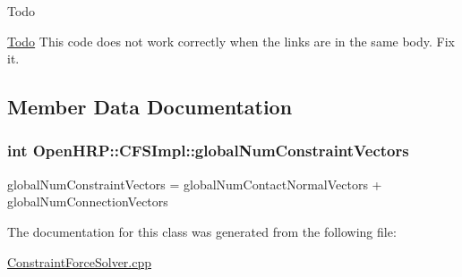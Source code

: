 \begin{DoxyRefDesc}{Todo}
\item[\hyperlink{todo__todo000002}{Todo}]This code does not work correctly when the links are in the same body. Fix it. \end{DoxyRefDesc}


\subsection{Member Data Documentation}
\hypertarget{classOpenHRP_1_1CFSImpl_aa2ce261868d0109321fd9d823aa19680}{
\subsubsection[{global\-Num\-Constraint\-Vectors}]{\setlength{\rightskip}{0pt plus 5cm}int Open\-H\-R\-P\-::\-C\-F\-S\-Impl\-::global\-Num\-Constraint\-Vectors}}\label{classOpenHRP_1_1CFSImpl_aa2ce261868d0109321fd9d823aa19680}
global\-Num\-Constraint\-Vectors = global\-Num\-Contact\-Normal\-Vectors + global\-Num\-Connection\-Vectors 

The documentation for this class was generated from the following file\-:\begin{DoxyCompactItemize}
\item 
\hyperlink{ConstraintForceSolver_8cpp}{Constraint\-Force\-Solver.\-cpp}\end{DoxyCompactItemize}
